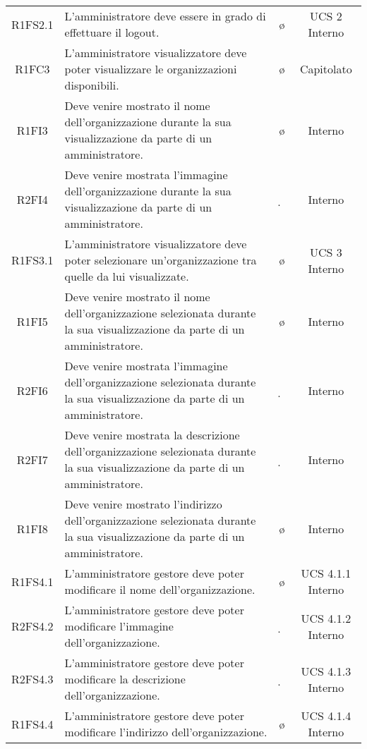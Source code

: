 {\begin{longtable}{ c C{6.5cm} c c}
R1FS2.1 & L'amministratore deve essere in grado di effettuare il logout. & \o & UCS 2 Interno\\

R1FC3 & L'amministratore visualizzatore deve poter visualizzare le organizzazioni disponibili. & \o & Capitolato\\

R1FI3 & Deve venire mostrato il nome dell'organizzazione durante la sua visualizzazione da parte di un amministratore. & \o & Interno\\

R2FI4 & Deve venire mostrata l'immagine dell'organizzazione durante la sua visualizzazione da parte di un amministratore. & \d & Interno\\

R1FS3.1 & L'amministratore visualizzatore deve poter selezionare un'organizzazione tra quelle da lui visualizzate. & \o & UCS 3 Interno\\

R1FI5 & Deve venire mostrato il nome dell'organizzazione selezionata durante la sua visualizzazione da parte di un amministratore. & \o & Interno\\

R2FI6 & Deve venire mostrata l'immagine dell'organizzazione selezionata durante la sua visualizzazione da parte di un amministratore. & \d & Interno\\

R2FI7 & Deve venire mostrata la descrizione dell'organizzazione selezionata durante la sua visualizzazione da parte di un amministratore. & \d & Interno\\

R1FI8 & Deve venire mostrato l'indirizzo dell'organizzazione selezionata durante la sua visualizzazione da parte di un amministratore. & \o & Interno\\


R1FS4.1 & L'amministratore gestore deve poter modificare il nome dell'organizzazione. & \o & UCS 4.1.1 Interno\\

R2FS4.2 & L'amministratore gestore deve poter modificare l'immagine dell'organizzazione. & \d & UCS 4.1.2 Interno\\

R2FS4.3 & L'amministratore gestore deve poter modificare la descrizione dell'organizzazione. & \d & UCS 4.1.3 Interno\\

R1FS4.4 & L'amministratore gestore deve poter modificare l'indirizzo dell'organizzazione. & \o & UCS 4.1.4 Interno\\


\end{longtable}}
